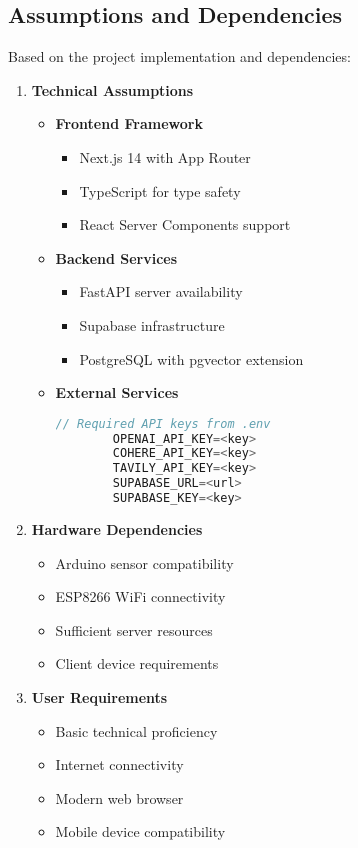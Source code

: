 \subsection{Assumptions and Dependencies}
Based on the project implementation and dependencies:

\begin{enumerate}
    \item \textbf{Technical Assumptions}
    \begin{itemize}
        \item \textbf{Frontend Framework}
        \begin{itemize}
            \item Next.js 14 with App Router
            \item TypeScript for type safety
            \item React Server Components support
        \end{itemize}

        \item \textbf{Backend Services}
        \begin{itemize}
            \item FastAPI server availability
            \item Supabase infrastructure
            \item PostgreSQL with pgvector extension
        \end{itemize}

        \item \textbf{External Services}
        \begin{lstlisting}[language=typescript]
        // Required API keys from .env
        OPENAI_API_KEY=<key>
        COHERE_API_KEY=<key>
        TAVILY_API_KEY=<key>
        SUPABASE_URL=<url>
        SUPABASE_KEY=<key>
        \end{lstlisting}
    \end{itemize}

    \item \textbf{Hardware Dependencies}
    \begin{itemize}
        \item Arduino sensor compatibility
        \item ESP8266 WiFi connectivity
        \item Sufficient server resources
        \item Client device requirements
    \end{itemize}

    \item \textbf{User Requirements}
    \begin{itemize}
        \item Basic technical proficiency
        \item Internet connectivity
        \item Modern web browser
        \item Mobile device compatibility
    \end{itemize}
\end{enumerate} 